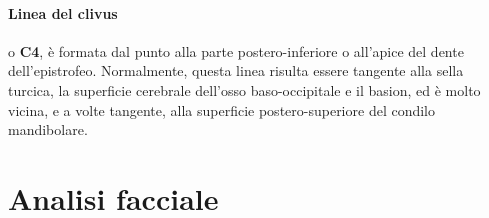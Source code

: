 \paragraph{Linea del clivus} o \textbf{C4}, è formata dal punto  alla parte postero-inferiore o all'apice del dente dell'epistrofeo. Normalmente, questa linea risulta essere tangente alla sella turcica, la superficie cerebrale dell'osso baso-occipitale e il basion, ed è molto vicina, e a volte tangente, alla superficie postero-superiore del condilo mandibolare.

\section{Analisi facciale}

\begin{figure}[!ht]
\centering
{}
\hspace{3em}
 \\

\end{figure}
